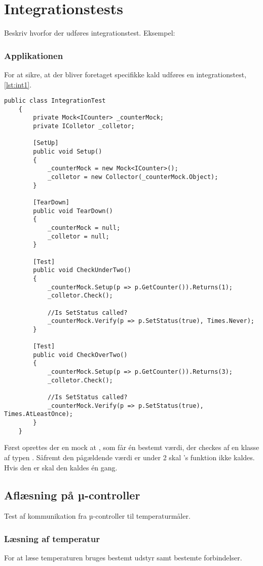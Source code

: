 \documentclass[Main]{subfiles}
\begin{document}
\chapter{Integrationstests}

Beskriv hvorfor der udføres integrationstest.
Eksempel:

\subsection{Applikationen}
For at sikre, at der bliver foretaget specifikke kald udføres en integrationstest, \codeTitle \ref{lst:int1}.

\begin{lstlisting}[caption=Integrationstest, style=Code-Java, label=lst:int1]
	public class IntegrationTest
	{
		private Mock<ICounter> _counterMock;
		private IColletor _colletor;

		[SetUp]
		public void Setup()
		{
			_counterMock = new Mock<ICounter>();
			_colletor = new Collector(_counterMock.Object);
		}

		[TearDown]
		public void TearDown()
		{
			_counterMock = null;
			_colletor = null;
		}

		[Test]
		public void CheckUnderTwo()
		{
			_counterMock.Setup(p => p.GetCounter()).Returns(1);
			_colletor.Check();
			
			//Is SetStatus called?
			_counterMock.Verify(p => p.SetStatus(true), Times.Never);
		}

		[Test]
		public void CheckOverTwo()
		{
			_counterMock.Setup(p => p.GetCounter()).Returns(3);
			_colletor.Check();
			
			//Is SetStatus called?
			_counterMock.Verify(p => p.SetStatus(true), Times.AtLeastOnce);
		}
	}
\end{lstlisting}

Først oprettes der en mock at , som får én bestemt værdi, der checkes af en  klasse af typen . 
Såfremt den pågældende værdi er under 2 skal 's funktion ikke kaldes.
Hvis den er skal den kaldes én gang.






\section{Aflæsning på µ-controller}
Test af kommunikation fra µ-controller til temperaturmåler.

\subsection{Læsning af temperatur}
For at læse temperaturen bruges bestemt udstyr samt bestemte forbindelser.
\end{document}
